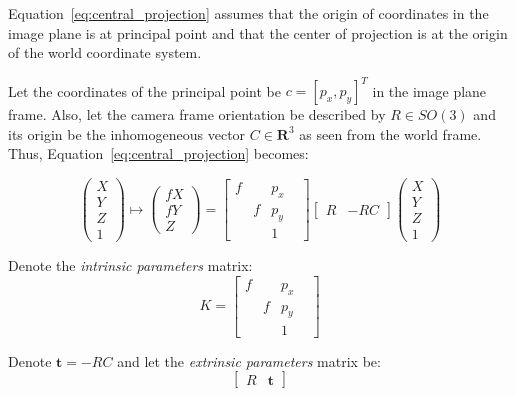 \documentclass[runningheads]{llncs}
\begin{document}
Equation~\ref{eq:central_projection} assumes that the origin of coordinates in
the image plane is at principal point and that the center of
projection is at the origin of the world coordinate system.

Let the coordinates of the principal point be $c = [p_x,p_y]^T$ in the
image plane frame. Also, let the camera frame orientation be described
by $R\in SO(3)$ and its origin be the inhomogeneous vector
$C\in \mathbf{R}^3$ as seen from the world frame. Thus,
Equation~\ref{eq:central_projection} becomes:

\begin{equation}\label{eq:central_projection1}
\begin{pmatrix}
X\\ Y\\ Z\\ 1
\end{pmatrix}
\mapsto
\begin{pmatrix}
fX\\ fY\\ Z
\end{pmatrix}
=
\begin{bmatrix}
f& &p_x& \\
 &f&p_y& \\
 & &1  &
\end{bmatrix}
\begin{bmatrix}
R & -RC
\end{bmatrix}
\begin{pmatrix}
X\\ Y\\ Z\\ 1
\end{pmatrix}
\end{equation}

Denote the \emph{intrinsic parameters} matrix:
\begin{equation}
\label{eq:intrinsic}
K=\begin{bmatrix} f & & p_x & \\ & f & p_y & \\ & & 1 & \end{bmatrix}
\end{equation}

Denote $\mathbf{t} = -RC$ and let the \emph{extrinsic parameters}
matrix be:
\begin{equation}
\begin{bmatrix}
R & \mathbf{t}
\end{bmatrix}
\end{equation}
\end{document}
